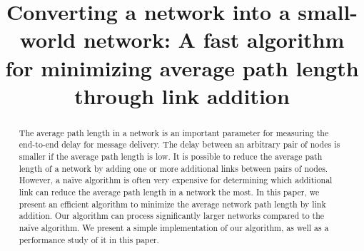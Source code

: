 \documentclass[journal,final,twocolumn,10pt,twoside]{IEEEtranTCOM}
\begin{document}
\title{Converting a network into a small-world network: 
A fast algorithm for minimizing average path length through link addition}    



% 
%


\maketitle

\begin{abstract}
The average path length in a network is an important parameter for measuring the 
end-to-end delay for message delivery. The delay between an arbitrary pair of nodes 
is smaller if the average path length is low. It is possible to reduce the average
path length of a network by adding one or more additional links between pairs of nodes.
However, a na\"ive algorithm is often very expensive for determining which additional link 
can reduce the average path length in a network the most. In this paper, we present 
an efficient algorithm to minimize the average network path length by link addition.  
Our algorithm can process significantly larger networks compared to the na\"ive 
algorithm. We present a simple implementation of our algorithm, as well as a performance 
study of it in this paper.  
\end{abstract}
\end{document}
